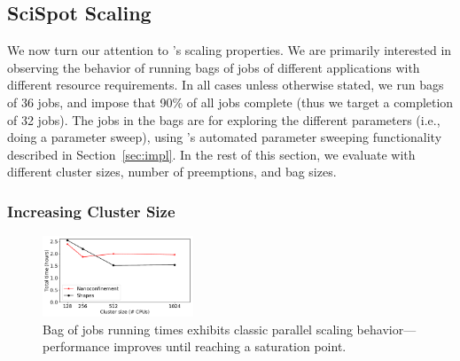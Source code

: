 
\subsection{SciSpot Scaling}

We now turn our attention to \sysname's scaling properties. We are primarily interested in observing the behavior of running bags of jobs of different applications with different resource requirements.
In all cases unless otherwise stated, we run bags of 36 jobs, and impose that 90\% of all jobs complete (thus we target a completion of 32 jobs).
The jobs in the bags are for exploring the different parameters (i.e., doing a parameter sweep), using \sysname's automated parameter sweeping functionality described in Section~\ref{sec:impl}.
In the rest of this section, we evaluate \sysname with different cluster  sizes, number of preemptions, and bag sizes. 


\subsubsection{Increasing Cluster Size} 

\begin{figure}
  \includegraphics[width=0.4\textwidth]{../graphs/vm-per-job-scaling.pdf}
      \vspace*{\myfigspace}
  \caption{Bag of jobs running times exhibits classic parallel scaling behavior---performance improves until reaching a saturation point.}
  \label{fig:vm-per-job-scaling}
    \vspace*{\myfigspace}
\end{figure}

